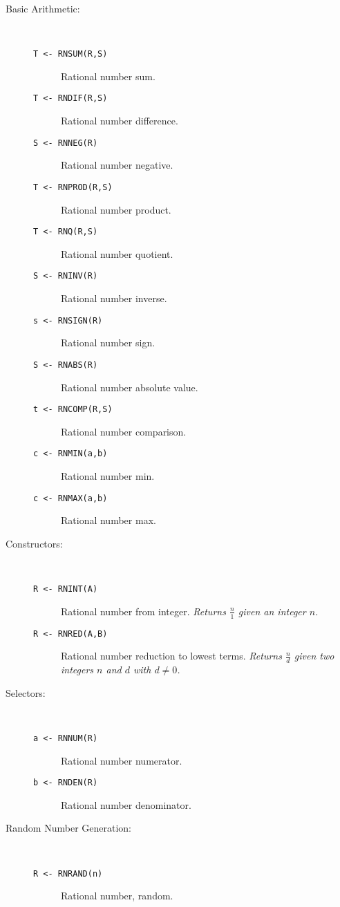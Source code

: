 \begin{description}
\item[Basic Arithmetic:] \ \
  \begin{description}
  \item[{\tt T <- RNSUM(R,S) 
}]  Rational number sum.
  \item[{\tt T <- RNDIF(R,S) 
}]  Rational number difference.
  \item[{\tt S <- RNNEG(R) 
}]  Rational number negative.
  \item[{\tt T <- RNPROD(R,S) 
}]  Rational number product.
  \item[{\tt T <- RNQ(R,S) 
}]  Rational number quotient.
  \item[{\tt S <- RNINV(R) 
}]  Rational number inverse.
  \item[{\tt s <- RNSIGN(R) 
}]  Rational number sign.
  \item[{\tt S <- RNABS(R) 
}]  Rational number absolute value.
  \item[{\tt t <- RNCOMP(R,S) 
}]  Rational number comparison.
  \item[{\tt c <- RNMIN(a,b) 
}]  Rational number min.
  \item[{\tt c <- RNMAX(a,b) 
}]  Rational number max.
  \end{description}

\item[Constructors:] \ \
  \begin{description}
  \item[{\tt R <- RNINT(A) 
}]  Rational number from integer. {\em Returns $\frac{n}{1}$
  given an integer $n$.}
  \item[{\tt R <- RNRED(A,B) 
}]  Rational number reduction to lowest terms. {\em Returns
  $\frac{n}{d}$ given two integers $n$ and $d$ with $d \neq 0$.}
  \end{description}

\item[Selectors:] \ \
  \begin{description}
  \item[{\tt a <- RNNUM(R) 
}]\index{RNNUM}  Rational number numerator.
  \item[{\tt b <- RNDEN(R) 
}]\index{RNDEN}  Rational number denominator.
  \end{description}

\item[Random Number Generation:] \ \
  \begin{description}
  \item[{\tt R <- RNRAND(n) 
}]  Rational number, random.
  \end{description}


\end{description}
